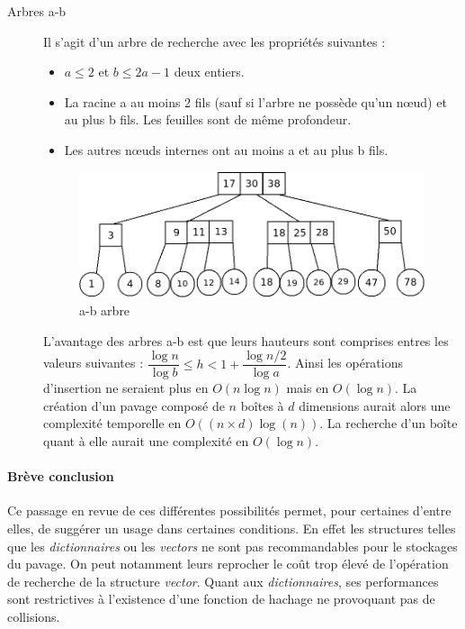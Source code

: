 \begin{description}
\item[Arbres a-b]
Il s'agit d'un arbre de recherche avec les propriétés suivantes :
\begin{itemize}
\item
  $a\leq2$ et $b\leq 2a−1$ deux entiers.
\item
  La racine a au moins 2 fils (sauf si l'arbre ne possède qu'un nœud) et au plus b fils.
  Les feuilles sont de même profondeur.
\item
  Les autres nœuds internes ont au moins a et au plus b fils.
\end{itemize}

\begin{figure}[h!tbp]
  \centering
  \includegraphics[scale=0.40]{img/abtree}
  \caption{a-b arbre}
  \label{fig:abtree}
\end{figure}

L'avantage des arbres a-b est que leurs hauteurs  sont comprises entres les valeurs suivantes : $ \dfrac{\log{n}}{\log{b}}   \leq h  < 1 + \dfrac{\log{n/2}}{\log{a}}$. Ainsi les opérations d'insertion ne seraient plus en $O(n\log{n})$ mais en $O(\log{n})$. La création d'un pavage composé de $n$ boîtes à $d$ dimensions aurait alors une complexité temporelle en $O((n\times d)\log(n))$. La recherche d'un boîte quant à elle aurait une complexité en $O(\log{n})$.

\end{description}
\paragraph{Brève conclusion}
Ce passage en revue de ces différentes possibilités permet, pour certaines d'entre elles, de suggérer un usage dans certaines conditions.  En effet les structures telles que les \emph{dictionnaires} ou les \emph{vectors} ne sont pas recommandables pour le stockages du pavage. On peut notamment leurs reprocher le coût trop élevé de l'opération de recherche de la structure \emph{vector}. Quant aux \emph{dictionnaires}, ses performances sont restrictives à l'existence d'une fonction de hachage ne provoquant pas de collisions. 

